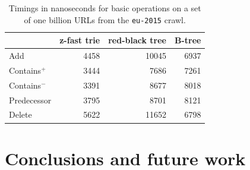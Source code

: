 \documentclass[a4paper]{article}
\newcommand{\?}{\mskip1.5mu}
\begin{document}
\begin{table}
\renewcommand{\arraystretch}{1.2}
\setlength{\tabcolsep}{10pt}
\centering
\begin{tabular}{lrrr}
&\multicolumn{1}{c}{z-fast trie}&\multicolumn{1}{c}{red-black tree}&\multicolumn{1}{c}{B-tree}\\
\hline
Add &          4458&10045&6937\\
Contains$^+$ & 3444&7686&7261\\
Contains$^-$ & 3391&8677&8018\\
Predecessor &  3795&8701&8121\\
Delete &       5622&11652&6798\\
\end{tabular}
\caption{\label{tab:urlsb}Timings in nanoseconds for basic operations on a set of one billion URLs from
the \texttt{eu-2015} crawl.}
\end{table}


\section{Conclusions and future work}



\end{document}
